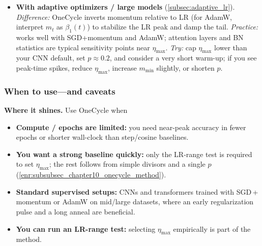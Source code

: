 \begin{enrichment}
\begin{itemize}
		\item \textbf{With adaptive optimizers / large models} (\autoref{subsec:adaptive_lr}). \emph{Difference:} OneCycle inverts momentum relative to LR (for AdamW, interpret $m_t$ as $\beta_1(t)$) to stabilize the LR peak and damp the tail. \emph{Practice:} works well with SGD+momentum and AdamW; attention layers and BN statistics are typical sensitivity points near $\eta_{\max}$. \emph{Try:} cap $\eta_{\max}$ lower than your CNN default, set $p\!\approx\!0.2$, and consider a very short warm-up; if you see peak-time spikes, reduce $\eta_{\max}$, increase $m_{\min}$ slightly, or shorten $p$.
	\end{itemize}
	
	\subsubsection{When to use—and caveats}
	\label{enr:subsubsec_chapter10_onecycle_when}
	
	\noindent\textbf{Where it shines.} Use OneCycle when
	\begin{itemize}
		\item \textbf{Compute / epochs are limited:} you need near-peak accuracy in fewer epochs or shorter wall-clock than step/cosine baselines.
		\item \textbf{You want a strong baseline quickly:} only the LR-range test is required to set $\eta_{\max}$; the rest follows from simple divisors and a single $p$ (\autoref{enr:subsubsec_chapter10_onecycle_method}).
		\item \textbf{Standard supervised setups:} CNNs and transformers trained with SGD\,+\,momentum or AdamW on mid/large datasets, where an early regularization pulse and a long anneal are beneficial.
		\item \textbf{You can run an LR-range test:} selecting $\eta_{\max}$ empirically is part of the method.
	\end{itemize}
	

\end{enrichment}
